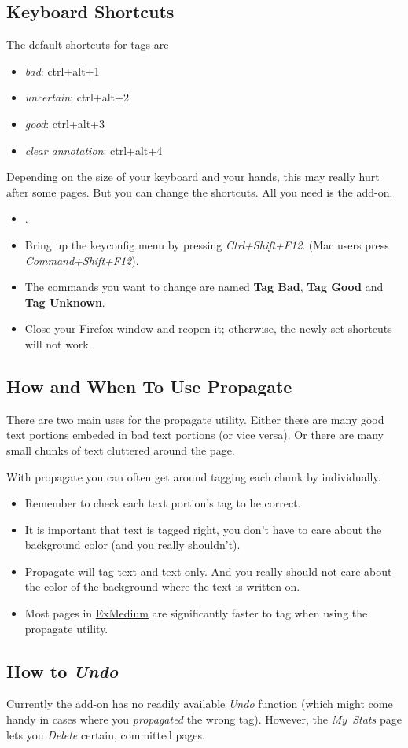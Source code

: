 \documentclass[12pt]{article}
\begin{document}
\subsection{Keyboard Shortcuts}
The default shortcuts for tags are \\
\begin{itemize}
	\item \emph{bad}: ctrl+alt+1
	\item \emph{uncertain}: ctrl+alt+2
	\item \emph{good}: ctrl+alt+3
	\item \emph{clear annotation}: ctrl+alt+4
\end{itemize}

Depending on the size of your keyboard and your hands, this may really hurt after some pages. But you can change the shortcuts. All you need is the  add-on.

\begin{itemize}
	\item {}.
	\item Bring up the keyconfig menu by pressing \emph{Ctrl+Shift+F12}. (Mac users press \emph{Command+Shift+F12}).
	\item The commands you want to change are named \textbf{Tag Bad}, \textbf{Tag Good} and \textbf{Tag Unknown}.
	\item Close your Firefox window and reopen it; otherwise, the newly set shortcuts will not work.
\end{itemize}


\subsection{How and When To Use Propagate}
\label{TnTProp}
There are two main uses for the propagate utility. Either there are many good text portions embeded in bad text portions (or vice versa). Or there are many small chunks of text cluttered around the page.

With propagate you can often get around tagging each chunk by individually.

\begin{itemize}
\item Remember to check each text portion's tag to be correct. \\
\item It is important that text is tagged right, you don't have to care about the background color (and you really shouldn't). \\
\item Propagate will tag text and text only. And you really should not care about the color of the background where the text is written on. \\
\item Most pages in \hyperref{Examples - Medium}{Examples - Medium, page ~}{}{ExMedium} are significantly faster to tag when using the propagate utility. \\
\end{itemize}


\subsection{How to \emph{Undo}}
Currently the add-on has no readily available \emph{Undo} function (which might come handy in cases where you \emph{propagated} the wrong tag). However, the \emph{My~Stats} page lets you \emph{Delete} certain, committed pages. 
\end{document}
